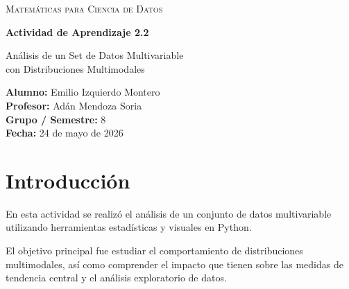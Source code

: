 \documentclass[12pt]{article}
\begin{document}

\begin{titlepage}
    \centering


    {\scshape\LARGE Matemáticas para Ciencia de Datos \par}

    \vspace{2cm}

    {\Huge\bfseries Actividad de Aprendizaje 2.2 \par}

    \vspace{0.7cm}

    {\Large
    Análisis de un Set de Datos Multivariable\\
    con Distribuciones Multimodales
    \par}

    \vspace{2.5cm}

    \begin{flushleft}
    \large
    \textbf{Alumno:} Emilio Izquierdo Montero \\[0.3cm]

    \textbf{Profesor:} Adán Mendoza Soria \\[0.3cm]

    \textbf{Grupo / Semestre:} 8 \\[0.3cm]

    \textbf{Fecha:} 24 de mayo de 2026
    \end{flushleft}

    \vfill

\end{titlepage}


\tableofcontents
\newpage


\section{Introducción}

En esta actividad se realizó el análisis de un conjunto de datos multivariable
utilizando herramientas estadísticas y visuales en Python.

El objetivo principal fue estudiar el comportamiento de distribuciones
multimodales, así como comprender el impacto que tienen sobre las medidas de
tendencia central y el análisis exploratorio de datos.
\end{document}
